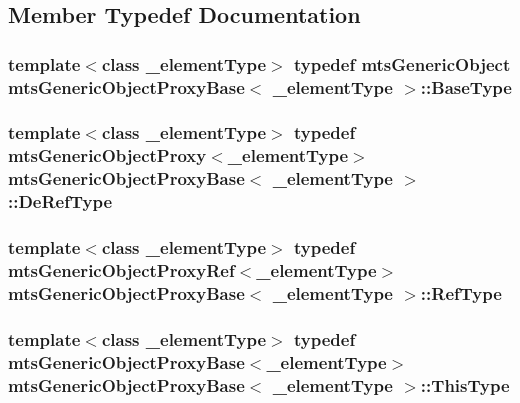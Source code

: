 \subsection{Member Typedef Documentation}
\hypertarget{classmts_generic_object_proxy_base_a61a6c330998d8ba0923ff57f0a30b81e}{
\subsubsection[{Base\-Type}]{\setlength{\rightskip}{0pt plus 5cm}template$<$class \-\_\-element\-Type$>$ typedef {\bf mts\-Generic\-Object} {\bf mts\-Generic\-Object\-Proxy\-Base}$<$ \-\_\-element\-Type $>$\-::{\bf Base\-Type}}}\label{classmts_generic_object_proxy_base_a61a6c330998d8ba0923ff57f0a30b81e}
\hypertarget{classmts_generic_object_proxy_base_ac87827bf98fee558160a8985c41f4126}{
\subsubsection[{De\-Ref\-Type}]{\setlength{\rightskip}{0pt plus 5cm}template$<$class \-\_\-element\-Type$>$ typedef {\bf mts\-Generic\-Object\-Proxy}$<$\-\_\-element\-Type$>$ {\bf mts\-Generic\-Object\-Proxy\-Base}$<$ \-\_\-element\-Type $>$\-::{\bf De\-Ref\-Type}}}\label{classmts_generic_object_proxy_base_ac87827bf98fee558160a8985c41f4126}
\hypertarget{classmts_generic_object_proxy_base_adddd01c8aea004bf5f0a5894438970c9}{
\subsubsection[{Ref\-Type}]{\setlength{\rightskip}{0pt plus 5cm}template$<$class \-\_\-element\-Type$>$ typedef {\bf mts\-Generic\-Object\-Proxy\-Ref}$<$\-\_\-element\-Type$>$ {\bf mts\-Generic\-Object\-Proxy\-Base}$<$ \-\_\-element\-Type $>$\-::{\bf Ref\-Type}}}\label{classmts_generic_object_proxy_base_adddd01c8aea004bf5f0a5894438970c9}
\hypertarget{classmts_generic_object_proxy_base_adfa837044848485e7241e56816a74083}{
\subsubsection[{This\-Type}]{\setlength{\rightskip}{0pt plus 5cm}template$<$class \-\_\-element\-Type$>$ typedef {\bf mts\-Generic\-Object\-Proxy\-Base}$<$\-\_\-element\-Type$>$ {\bf mts\-Generic\-Object\-Proxy\-Base}$<$ \-\_\-element\-Type $>$\-::{\bf This\-Type}}}\label{classmts_generic_object_proxy_base_adfa837044848485e7241e56816a74083}
